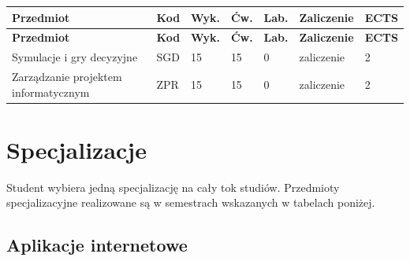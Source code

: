 \documentclass[12pt,a4paper]{article}
\newcommand{\thdrule}{\noalign{\global\setlength{\extrarowheight}{0pt}}}
\newcommand{\thdend}{\noalign{\global\setlength{\extrarowheight}{4pt}}}
\begin{document}
{\scriptsize
\begin{longtable}{m{5.5cm}m{0.8cm}m{1cm}m{1cm}m{1cm}m{1.7cm}m{0.7cm}}
\thdrule\toprule
\rowcolor{pjatkRed}
{\color{white}\footnotesize\textbf{\vphantom{Ag}Przedmiot}} & {\color{white}\footnotesize\textbf{\vphantom{Ag}Kod}} & {\color{white}\footnotesize\textbf{\vphantom{Ag}Wyk.}} & {\color{white}\footnotesize\textbf{\vphantom{Ag}Ćw.}} & {\color{white}\footnotesize\textbf{\vphantom{Ag}Lab.}} & {\color{white}\footnotesize\textbf{\vphantom{Ag}Zaliczenie}} & {\color{white}\footnotesize\textbf{\vphantom{Ag}ECTS}} \\
\midrule\thdend
\endfirsthead
\thdrule\toprule
\rowcolor{pjatkRed}
{\color{white}\footnotesize\textbf{\vphantom{Ag}Przedmiot}} & {\color{white}\footnotesize\textbf{\vphantom{Ag}Kod}} & {\color{white}\footnotesize\textbf{\vphantom{Ag}Wyk.}} & {\color{white}\footnotesize\textbf{\vphantom{Ag}Ćw.}} & {\color{white}\footnotesize\textbf{\vphantom{Ag}Lab.}} & {\color{white}\footnotesize\textbf{\vphantom{Ag}Zaliczenie}} & {\color{white}\footnotesize\textbf{\vphantom{Ag}ECTS}} \\
\midrule\thdend
\endhead
\rowcolor{tableRowLight} Symulacje i gry decyzyjne & SGD & 15 & 15 & 0 & {\scriptsize zaliczenie} & 2 \\
\rowcolor{tableRowAlt} Zarządzanie projektem informatycznym & ZPR & 15 & 15 & 0 & {\scriptsize zaliczenie} & 2 \\
\bottomrule
\end{longtable}}



\newpage

\section{Specjalizacje}

Student wybiera jedną specjalizację na cały tok studiów. Przedmioty specjalizacyjne realizowane są w semestrach wskazanych w tabelach poniżej.

\subsection*{Aplikacje internetowe}
\end{document}
